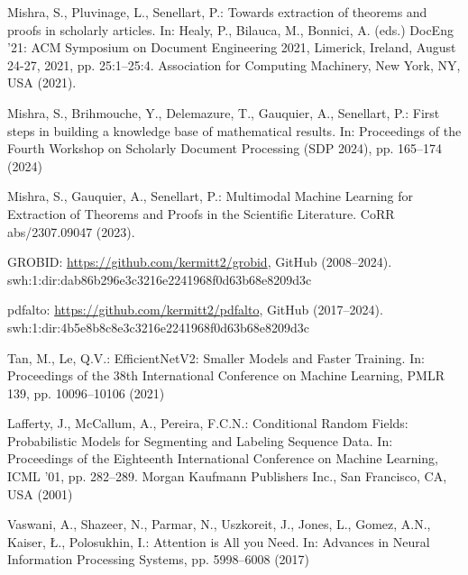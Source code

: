 \documentclass[runningheads]{llncs}
\begin{document}
%
\begin{thebibliography}{10}
Mishra, S., Pluvinage, L., Senellart, P.: Towards extraction of theorems and proofs in scholarly articles. In: Healy, P., Bilauca, M., Bonnici, A. (eds.) DocEng '21: ACM Symposium on Document Engineering 2021, Limerick, Ireland, August 24-27, 2021, pp. 25:1--25:4. Association for Computing Machinery, New York, NY, USA (2021). 

Mishra, S., Brihmouche, Y., Delemazure, T., Gauquier, A., Senellart, P.: First steps in building a knowledge base of mathematical results. In: Proceedings of the Fourth Workshop on Scholarly Document Processing (SDP 2024), pp. 165--174 (2024)

Mishra, S., Gauquier, A., Senellart, P.: Multimodal Machine Learning for Extraction of Theorems and Proofs in the Scientific Literature. CoRR abs/2307.09047 (2023). 

GROBID: \url{https://github.com/kermitt2/grobid}, GitHub (2008--2024). swh:1:dir:dab86b296e3c3216e2241968f0d63b68e8209d3c

pdfalto: \url{https://github.com/kermitt2/pdfalto}, GitHub (2017--2024). swh:1:dir:4b5e8b8c8e3c3216e2241968f0d63b68e8209d3c

Tan, M., Le, Q.V.: EfficientNetV2: Smaller Models and Faster Training. In: Proceedings of the 38th International Conference on Machine Learning, PMLR 139, pp. 10096--10106 (2021)

Lafferty, J., McCallum, A., Pereira, F.C.N.: Conditional Random Fields: Probabilistic Models for Segmenting and Labeling Sequence Data. In: Proceedings of the Eighteenth International Conference on Machine Learning, ICML '01, pp. 282--289. Morgan Kaufmann Publishers Inc., San Francisco, CA, USA (2001)

Vaswani, A., Shazeer, N., Parmar, N., Uszkoreit, J., Jones, L., Gomez, A.N., Kaiser, Ł., Polosukhin, I.: Attention is All you Need. In: Advances in Neural Information Processing Systems, pp. 5998--6008 (2017)
\end{thebibliography}
\end{document}
